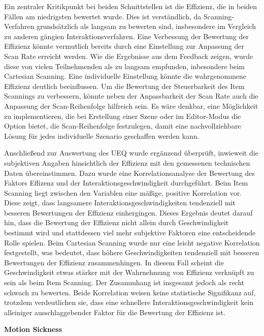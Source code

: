 Ein zentraler Kritikpunkt bei beiden Schnittstellen ist die Effizienz, die in beiden Fällen am niedrigsten bewertet wurde. Dies ist verständlich, da Scanning-Verfahren grundsätzlich als langsam zu bewerten sind, insbesondere im Vergleich zu anderen gängien Interaktionsverfahren. Eine Verbessung der Bewertung der Effizienz könnte vermutlich bereits durch eine Einstellung zur Anpassung der Scan Rate erreicht werden. Wie die Ergebnisse aus dem Feedback zeigen, wurde diese von vielen Teilnehmenden als zu langsam empfunden, inbesondere beim Cartesian Scanning. Eine individuelle Einstellung könnte die wahrgenommene Effizienz deutlich beeinflussen. 
Um die Bewertung der Steuerbarkeit des Item Scannings zu verbessern, könnte neben der Anpassbarkeit der Scan Rate auch die Anpassung der Scan-Reihenfolge hilfreich sein. Es wäre denkbar, eine Möglichkeit zu implementieren, die bei Erstellung einer Szene oder im Editor-Modus die Option bietet, die Scan-Reihenfolge festzulegen, damit eine nachvollziehbare Lösung für jedes individuelle Szenario geschaffen werden kann. 

Anschließend zur Auswertung des UEQ wurde ergänzend überprüft, inwieweit die subjektiven Angaben hinsichtlich der Effizienz mit den gemessenen technischen Daten übereinstimmen. Dazu wurde eine Korrelationsanalyse der Bewertung des Faktors Effizenz und der Interaktionsgeschwindigkeit durchgeführt. 
Beim Item Scanning liegt zwischen den Variablen eine mäßige, positive Korrelation vor. Diese zeigt, dass langsamere Interaktionsgeschwindigkeiten tendenziell mit besseren Bewertungen der Effizienz einhergingen. Dieses Ergebnis deutet darauf hin, dass die Bewertung der Effizienz nicht allein durch Geschwindigkeit bestimmt wird und stattdessen viel mehr subjektive Faktoren eine entscheidende Rolle spielen.
Beim Cartesian Scanning wurde nur eine leicht negative Korrelation festgestellt, was bedeutet, dass höhere Geschwindigkeiten tendenziell mit besseren Bewertungen der Effizienz zusammenhingen. In diesem Fall scheint die Geschwindigkeit etwas stärker mit der Wahrnehmung von Effizienz verknüpft zu sein als beim Item Scanning. Der Zusammhang ist insgesamt jedoch als recht schwach zu bewerten. Beide Korrelation weisen keine statistische Signifikanz auf, trotzdem verdeutlichen sie, dass eine schnellere Interaktionsgeschwindigkeit kein alleiniger ausschlaggebender Faktor für die Bewertung der Effizienz ist.

\textbf{Motion Sickness}

